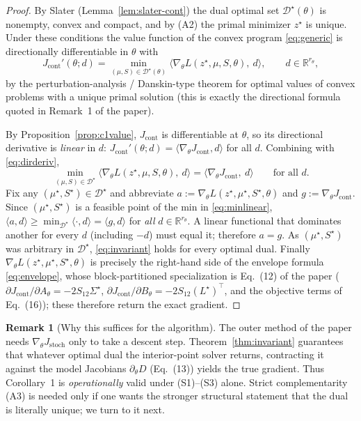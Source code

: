 \documentclass[11pt]{article}
\theoremstyle{definition}
\newtheorem{remark}{Remark}
\newcommand{\R}{\mathbb{R}}
\newcommand{\Th}{\theta}
\newcommand{\Sig}{\Sigma}
\begin{document}
\begin{proof}
By Slater (Lemma~\ref{lem:slater-cont}) the dual optimal set $\mathcal
D^\star(\Th)$ is nonempty, convex and compact, and by (A2) the primal minimizer
$z^\star$ is unique. Under these conditions the value function of the convex
program \eqref{eq:generic} is directionally differentiable in $\Th$ with
\begin{equation}\label{eq:dirderiv}
J_{\mathrm{cont}}'(\Th;d)
=\min_{(\mu,S)\in\mathcal D^\star(\Th)}
\big\langle \nabla_\Th L(z^\star,\mu,S,\Th),\ d\big\rangle,
\qquad d\in\R^{r_\theta},
\end{equation}
by the perturbation-analysis / Danskin-type theorem for optimal values of convex
problems with a unique primal solution \cite[Thm.~4.24, Prop.~4.22]{BonnansShapiro}
(this is exactly the directional formula quoted in Remark~1 of the paper).

By Proposition~\ref{prop:c1value}, $J_{\mathrm{cont}}$ is differentiable at
$\Th$, so its directional derivative is \emph{linear} in $d$:
$J_{\mathrm{cont}}'(\Th;d)=\langle\nabla_\Th J_{\mathrm{cont}},d\rangle$ for all
$d$. Combining with \eqref{eq:dirderiv},
\begin{equation}\label{eq:minlinear}
\min_{(\mu,S)\in\mathcal D^\star}
\big\langle \nabla_\Th L(z^\star,\mu,S,\Th),\ d\big\rangle
=\big\langle \nabla_\Th J_{\mathrm{cont}},\ d\big\rangle
\qquad\text{for all } d .
\end{equation}
Fix any $(\mu^\star,S^\star)\in\mathcal D^\star$ and abbreviate
$a:=\nabla_\Th L(z^\star,\mu^\star,S^\star,\Th)$ and $g:=\nabla_\Th
J_{\mathrm{cont}}$. Since $(\mu^\star,S^\star)$ is a feasible point of the min in
\eqref{eq:minlinear}, $\langle a,d\rangle\ge\min_{\mathcal D^\star}\langle\cdot,d
\rangle=\langle g,d\rangle$ for \emph{all} $d\in\R^{r_\theta}$. A linear
functional that dominates another for every $d$ (including $-d$) must equal it;
therefore $a=g$. As $(\mu^\star,S^\star)$ was arbitrary in $\mathcal D^\star$,
\eqref{eq:invariant} holds for every optimal dual. Finally $\nabla_\Th
L(z^\star,\mu^\star,S^\star,\Th)$ is precisely the right-hand side of the envelope
formula \eqref{eq:envelope}, whose block-partitioned specialization is Eq.~(12)
of the paper ($\partial J_{\mathrm{cont}}/\partial A_\Th=-2S_{12}\Sig^\star$,
$\partial J_{\mathrm{cont}}/\partial B_\Th=-2S_{12}(L^\star)^\top$, and the
objective terms of Eq.~(16)); these therefore return the exact gradient.
\end{proof}

\begin{remark}[Why this suffices for the algorithm]\label{rem:algo}
The outer method of the paper needs $\nabla_\Th J_{\mathrm{stoch}}$ only to take a
descent step. Theorem~\ref{thm:invariant} guarantees that whatever optimal dual
the interior-point solver returns, contracting it against the model Jacobians
$\partial_\Th D$ (Eq.~(13)) yields the true gradient. Thus Corollary~1 is
\emph{operationally} valid under (S1)--(S3) alone. Strict complementarity (A3) is
needed only if one wants the stronger structural statement that the dual is
literally unique; we turn to it next.
\end{remark}
\end{document}

